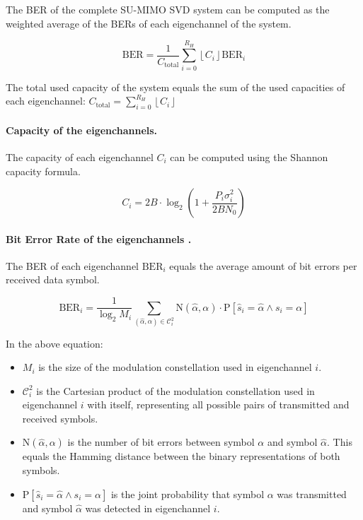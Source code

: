\documentclass[a4paper,12pt]{article}
\begin{document}
\noindent The BER of the complete SU-MIMO SVD system can be computed as the weighted average of the BERs of each eigenchannel of the system.

\begin{equation}
\mathrm{BER} = \frac{1}{C_{\text{total}}} \sum_{i=0}^{R_{H}} \left\lfloor C_i \right\rfloor \mathrm{BER}_i
\end{equation}

\noindent The total used capacity of the system equals the sum of the used capacities of each eigenchannel: $ C_{\text{total}} = \sum_{i=0}^{R_{H}} \left\lfloor C_i \right\rfloor $

\paragraph{Capacity of the eigenchannels.}
The capacity of each eigenchannel $C_i$ can be computed using the Shannon capacity formula.

\begin{equation}
    C_i = 2B \cdot \log_2(1 + \frac{P_i \sigma^{2}_i}{2B N_0}) \label{eq:Ci}
\end{equation}
\paragraph{Bit Error Rate of the eigenchannels \cite{syllabus_communicatietheorie}.}
The BER of each eigenchannel $\mathrm{BER}_i$ equals the average amount of bit errors per received data symbol.

\begin{equation}
    \mathrm{BER}_i = \frac{1}{\log_2{M_i}} \sum_{(\hat{\alpha}, \alpha) \in \mathcal{C}^{2}_i} \mathrm{N}(\hat{\alpha}, \alpha) \cdot \mathrm{P}[\hat{s}_i = \hat{\alpha} \land s_i = \alpha] \label{eq:BERi}
\end{equation}

\noindent In the above equation:
\begin{itemize}

    \item $ M_i $ is the size of the modulation constellation used in eigenchannel $i$.

    \item $ \mathcal{C}^{2}_i $ is the Cartesian product of the modulation constellation used in eigenchannel $i$ with itself, representing all possible pairs of transmitted and received symbols.
    
    \item $ \mathrm{N}(\hat{\alpha}, \alpha) $ is the number of bit errors between symbol $\alpha$ and symbol $\hat{\alpha}$. This equals the Hamming distance between the binary representations of both symbols.

    \item $ \mathrm{P}[\hat{s}_i = \hat{\alpha} \land s_i = \alpha] $ is the joint probability that symbol $\alpha$ was transmitted and symbol $\hat{\alpha}$ was detected in eigenchannel $i$.

\end{itemize}
\end{document}
